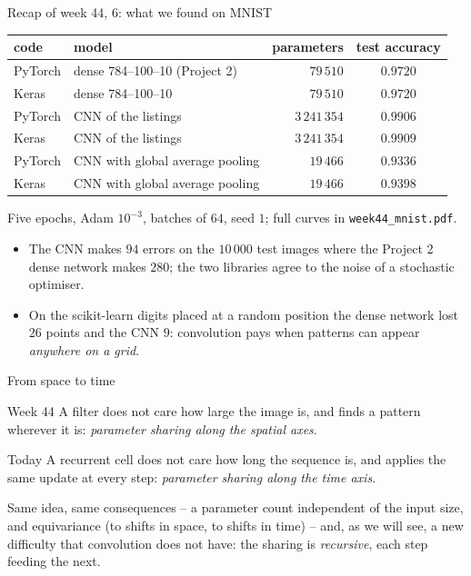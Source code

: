 \documentclass[10pt,aspectratio=169]{beamer}
\begin{document}
\begin{frame}{Recap of week 44, 6: what we found on MNIST}
\begin{center}
\small
\begin{tabular}{@{}llrc@{}}
\toprule
code & model & parameters & test accuracy\\
\midrule
PyTorch & dense 784--100--10 (Project 2) & $79\,510$ & $0.9720$\\
Keras & dense 784--100--10 & $79\,510$ & $0.9720$\\
PyTorch & CNN of the listings & $3\,241\,354$ & $0.9906$\\
Keras & CNN of the listings & $3\,241\,354$ & $0.9909$\\
PyTorch & CNN with global average pooling & $19\,466$ & $0.9336$\\
Keras & CNN with global average pooling & $19\,466$ & $0.9398$\\
\bottomrule
\end{tabular}

\medskip
\footnotesize Five epochs, Adam $10^{-3}$, batches of $64$, seed $1$; full
curves in \texttt{week44\_mnist.pdf}.
\end{center}
\begin{itemize}
  \item The CNN makes $94$ errors on the $10\,000$ test images where the
        Project 2 dense network makes $280$; the two libraries agree to the
        noise of a stochastic optimiser.
  \item On the scikit-learn digits placed at a random position the dense
        network lost $26$ points and the CNN $9$: convolution pays when
        patterns can appear \emph{anywhere on a grid}.
\end{itemize}
\end{frame}

\begin{frame}{From space to time}
\begin{block}{Week 44}
A filter does not care how large the image is, and finds a pattern wherever
it is: \emph{parameter sharing along the spatial axes}.
\end{block}
\begin{block}{Today}
A recurrent cell does not care how long the sequence is, and applies the
same update at every step: \emph{parameter sharing along the time axis}.
\end{block}
\medskip
Same idea, same consequences -- a parameter count independent of the input
size, and equivariance (to shifts in space, to shifts in time) -- and, as we
will see, a new difficulty that convolution does not have: the sharing is
\emph{recursive}, each step feeding the next.
\end{frame}
\end{document}
